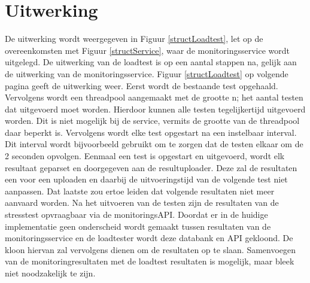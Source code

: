 \section{Uitwerking}
\npar
De uitwerking wordt weergegeven in Figuur \ref{structLoadtest}, let op de overeenkomsten met Figuur \ref{structService}, waar de monitoringsservice wordt uitgelegd. De uitwerking van de loadtest is op een aantal stappen na, gelijk aan de uitwerking van de monitoringsservice. 
\npar
Figuur \ref{structLoadtest} op volgende pagina geeft de uitwerking weer. Eerst wordt de bestaande test opgehaald. Vervolgens wordt een threadpool aangemaakt met de grootte n; het aantal testen dat uitgevoerd moet worden. Hierdoor kunnen alle testen tegelijkertijd uitgevoerd worden. Dit is niet mogelijk bij de service, vermits de grootte van de threadpool daar beperkt is. Vervolgens wordt elke test opgestart na een instelbaar interval. Dit interval wordt bijvoorbeeld gebruikt om te zorgen dat de testen elkaar om de 2 seconden opvolgen.
\npar
Eenmaal een test is opgestart en uitgevoerd, wordt elk resultaat geparset en doorgegeven aan de resultuploader. Deze zal de resultaten een voor een uploaden en daarbij de uitvoeringstijd van de volgende test niet aanpassen. Dat laatste zou ertoe leiden dat volgende resultaten niet meer aanvaard worden.
\npar
Na het uitvoeren van de testen zijn de resultaten van de stresstest opvraagbaar via de monitoringsAPI. Doordat er in de huidige implementatie geen onderscheid wordt gemaakt tussen resultaten van de monitoringsservice en de loadtester wordt deze databank en API gekloond. De kloon hiervan zal vervolgens dienen om de resultaten op te slaan. Samenvoegen van de monitoringresultaten met de loadtest resultaten is mogelijk, maar bleek niet noodzakelijk te zijn.

